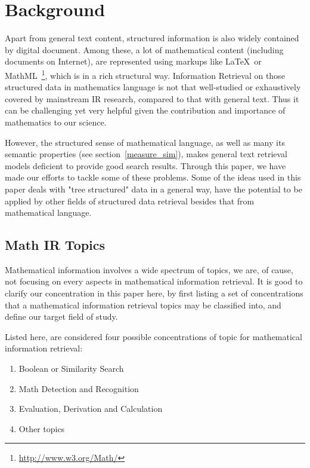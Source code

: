 \chapter{Background}
Apart from general text content, structured information is also widely contained by digital document. Among these, a lot of mathematical content (including documents on Internet), are represented using markups like \LaTeX\  or MathML~\footnote{\url{http://www.w3.org/Math/}}, which is in a rich structural way. 
Information Retrieval on those structured data in mathematics language is not that well-studied or exhaustively covered by mainstream IR research, compared to that with general text. 
Thus it can be challenging yet very helpful given the contribution and importance of mathematics to our science. 

However, the structured sense of mathematical language, as well as many its semantic properties (see section~\ref{measure_sim}), makes general text retrieval models deficient to provide good search results. Through this paper, we have made our efforts to tackle some of these problems. 
Some of the ideas used in this paper deals with "tree structured" data in a general way, have the potential to be applied by other fields of structured data retrieval besides that from mathematical language. 

\section{Math IR Topics}

Mathematical information involves a wide spectrum of topics, 
we are, of cause, not focusing on every aspects in mathematical information retrieval. 
It is good to clarify our concentration in this paper here, by first listing a set of concentrations that a mathematical information retrieval topics may be classified into,
and define our target field of study.

\pagebreak
Listed here, are considered four possible concentrations of topic for mathematical information retrieval:

\begin{enumerate}
\item Boolean or Similarity Search
\item Math Detection and Recognition
\item Evaluation, Derivation and Calculation
\item Other topics 
\end{enumerate}

